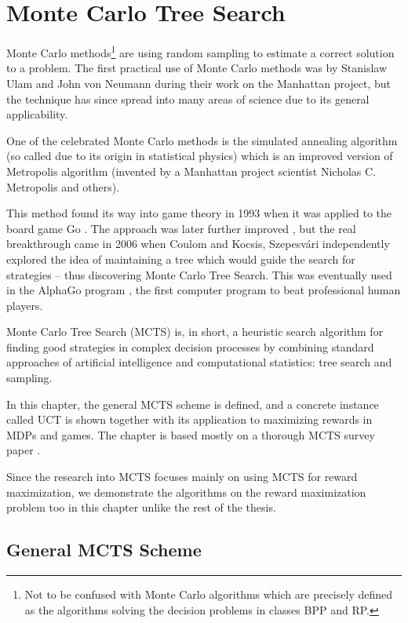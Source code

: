 \chapter{Monte Carlo Tree Search}
\label{ch_mcts}

Monte Carlo methods\footnote{Not to be confused with Monte Carlo
algorithms which are precisely defined as the algorithms solving the
decision problems in classes BPP and RP.} are using random sampling to
estimate a correct solution to a problem. The first practical use of Monte
Carlo methods was by Stanislaw Ulam and John von Neumann during their
work on the Manhattan project, but the technique has since spread into
many areas of science due to its general applicability.

One of the celebrated Monte Carlo methods
is the simulated annealing algorithm (so called due to its
origin in statistical physics) which is an improved version of
Metropolis algorithm (invented by a Manhattan project scientist
Nicholas C. Metropolis and others).

This method found its way into game
theory in 1993 when it was applied to the board game Go
\parencite{MonteCarloGo}. The approach was later further improved
\parencite{MonteCarloGoDevel}, but the real breakthrough came in 2006
when Coulom \parencite{Coulom} and Kocsis, Szepesvári \parencite{Kocsis}
independently explored the idea of maintaining a tree which would guide the
search for strategies -- thus discovering Monte Carlo Tree Search.
This was eventually used in the AlphaGo program
\parencite{alphago}, the first
computer program to beat professional human players.

Monte Carlo Tree Search (MCTS) is, in short, a
heuristic search algorithm for finding good strategies in complex
decision processes by combining standard approaches of artificial
intelligence and computational statistics: tree search and sampling.

In this chapter, the general MCTS scheme is defined, and a concrete instance
called UCT is shown together with its application to maximizing rewards
in MDPs and games. The chapter is based mostly on a thorough MCTS survey
paper \parencite{mcts_survey}.

Since the research into MCTS focuses mainly on using MCTS for reward
maximization, we demonstrate the algorithms on the reward maximization
problem too in this chapter unlike the rest of the thesis.

\section{General MCTS Scheme}

